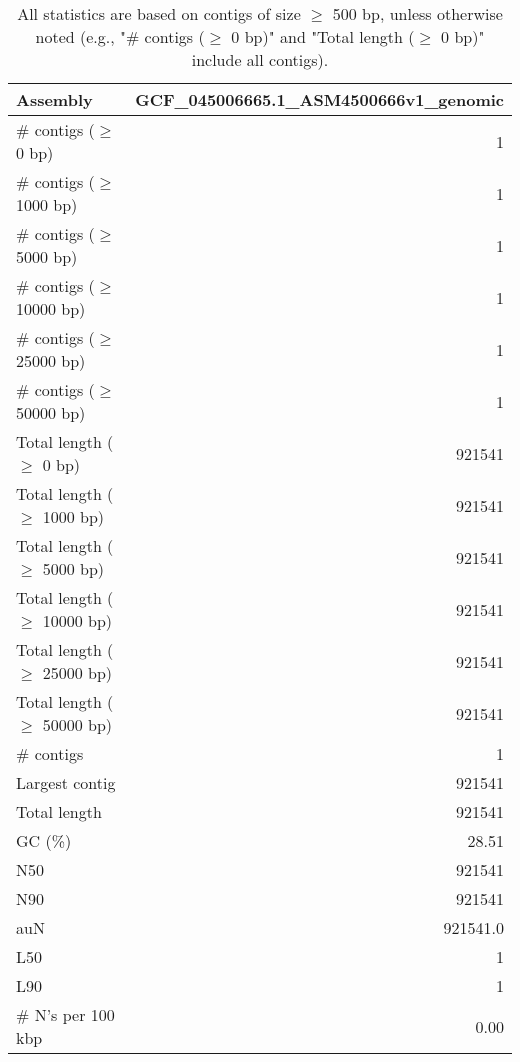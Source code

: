 \documentclass[12pt,a4paper]{article}
\begin{document}
\begin{table}[ht]
\begin{center}
\caption{All statistics are based on contigs of size $\geq$ 500 bp, unless otherwise noted (e.g., "\# contigs ($\geq$ 0 bp)" and "Total length ($\geq$ 0 bp)" include all contigs).}
\begin{tabular}{|l*{1}{|r}|}
\hline
Assembly & GCF\_045006665.1\_ASM4500666v1\_genomic \\ \hline
\# contigs ($\geq$ 0 bp) & 1 \\ \hline
\# contigs ($\geq$ 1000 bp) & 1 \\ \hline
\# contigs ($\geq$ 5000 bp) & 1 \\ \hline
\# contigs ($\geq$ 10000 bp) & 1 \\ \hline
\# contigs ($\geq$ 25000 bp) & 1 \\ \hline
\# contigs ($\geq$ 50000 bp) & 1 \\ \hline
Total length ($\geq$ 0 bp) & 921541 \\ \hline
Total length ($\geq$ 1000 bp) & 921541 \\ \hline
Total length ($\geq$ 5000 bp) & 921541 \\ \hline
Total length ($\geq$ 10000 bp) & 921541 \\ \hline
Total length ($\geq$ 25000 bp) & 921541 \\ \hline
Total length ($\geq$ 50000 bp) & 921541 \\ \hline
\# contigs & 1 \\ \hline
Largest contig & 921541 \\ \hline
Total length & 921541 \\ \hline
GC (\%) & 28.51 \\ \hline
N50 & 921541 \\ \hline
N90 & 921541 \\ \hline
auN & 921541.0 \\ \hline
L50 & 1 \\ \hline
L90 & 1 \\ \hline
\# N's per 100 kbp & 0.00 \\ \hline
\end{tabular}
\end{center}
\end{table}
\end{document}
